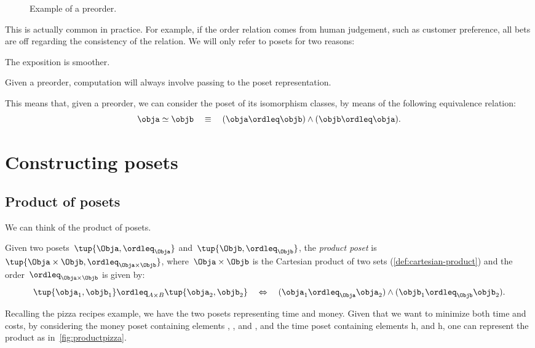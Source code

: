\begin{figure}[tbh]
    \begin{center}
    \end{center}
    \caption{Example of a preorder. \label{fig:preorder}}
\end{figure}

This is actually common in practice. For example, if the order relation comes from human judgement, such as customer preference, all bets are off regarding the consistency of the relation. We will only refer to posets for two reasons:
\begin{compactenum}
    \item The exposition is smoother.
    \item Given a preorder, computation will always involve passing to the poset representation.
\end{compactenum}
This means that, given a preorder, we can consider the poset of its isomorphism classes, by means of the following equivalence relation:
\begin{equation}
    \obja \simeq \objb \quad \equiv \quad (\obja \ordleq \objb) \wedge (\objb \ordleq \obja).
\end{equation}


\section{Constructing posets}

\subsection{Product of posets}
We can think of the product of posets.

\begin{definition}
    \label{def:productposet}
    Given two posets~$\tup{\Obja, \ordleq_{\Obja}}$
    and~$\tup{\Objb, \ordleq_{\Objb}}$, the \emph{product poset} is~$\tup{\Obja \times \Objb, \ordleq_{\Obja\times \Objb}}$, where~$\Obja \times \Objb$ is the Cartesian product of two sets (\cref{def:cartesian-product}) and the order~$\ordleq_{\Obja \times \Objb}$ is given by:
    \begin{equation}
        \tup{\obja_1, \objb_1}
        \ordleq_{A\times B}
        \tup{\obja_2, \objb_2}
        \quad
        \Leftrightarrow
        \quad
        (\obja_1 \ordleq_\Obja \obja_2) \wedge
        (\objb_1 \ordleq_\Objb \objb_2).
    \end{equation}
\end{definition}
Recalling the pizza recipes example, we have the two posets representing time and money. Given that we want to minimize both time and costs, by considering the money poset containing elements \unit[1]{\USD}, \unit[2]{\USD}, and \unit[3]{\USD}, and the time poset containing elements \unit[1]{h}, and \unit[2]{h}, one can represent the product as in~\cref{fig:productpizza}.

